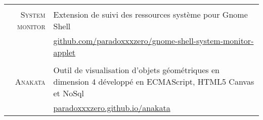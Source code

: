 \documentclass[a4paper,10pt]{article}
\begin{document}
\begin{tabular}{r|p{11cm}}
    \multicolumn{2}{c}{} \\
    \textsc{System monitor}
      & Extension de suivi des ressources système pour Gnome Shell \\
      & \href{https://github.com/paradoxxxzero/gnome-shell-system-monitor-applet}{github.com/paradoxxxzero/gnome-shell-system-monitor-applet} \\

    \multicolumn{2}{c}{} \\
    \textsc{Anakata}
      & Outil de visualisation d’objets géométriques en dimension 4 développé en ECMAScript, HTML5 Canvas et NoSql \\
      & \href{http://paradoxxxzero.github.io/anakata/}{paradoxxxzero.github.io/anakata} \\
  \end{tabular}
\end{document}
